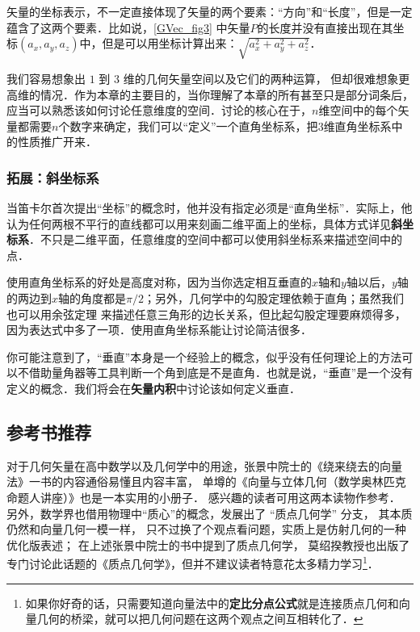 矢量的坐标表示，不一定直接体现了矢量的两个要素：“方向”和“长度”，但是一定蕴含了这两个要素．比如说，\autoref{GVec_fig3} 中矢量$P$的长度并没有直接出现在其坐标$(a_x, a_y, a_z)$中，但是可以用坐标计算出来：$\sqrt{a_x^2+a_y^2+a_z^2}$．

我们容易想象出 $1$ 到 $3$ 维的几何矢量空间以及它们的两种运算， 但却很难想象更高维的情况．作为本章的主要目的，当你理解了本章的所有甚至只是部分词条后，应当可以熟悉该如何讨论任意维度的空间．讨论的核心在于，$n$维空间中的每个矢量都需要$n$个数字来确定，我们可以“定义”一个直角坐标系，把$3$维直角坐标系中的性质推广开来．

\subsubsection{拓展：斜坐标系}

当笛卡尔首次提出“坐标”的概念时，他并没有指定必须是“直角坐标”．实际上，他认为任何两根不平行的直线都可以用来刻画二维平面上的坐标，具体方式详见\textbf{斜坐标系}．不只是二维平面，任意维度的空间中都可以使用斜坐标系来描述空间中的点．

使用直角坐标系的好处是高度对称，因为当你选定相互垂直的$x$轴和$y$轴以后，$y$轴的两边到$x$轴的角度都是$\pi/2$；另外，几何学中的勾股定理依赖于直角；虽然我们也可以用余弦定理%
来描述任意三角形的边长关系，但比起勾股定理要麻烦得多，因为表达式中多了一项．使用直角坐标系能让讨论简洁很多．

你可能注意到了，“垂直”本身是一个经验上的概念，似乎没有任何理论上的方法可以不借助量角器等工具判断一个角到底是不是直角．也就是说，“垂直”是一个没有定义的概念．我们将会在\textbf{矢量内积}中讨论该如何定义垂直．



\subsection{参考书推荐}
对于几何矢量在高中数学以及几何学中的用途，张景中院士的《绕来绕去的向量法》一书的内容通俗易懂且内容丰富， 单墫的《向量与立体几何（数学奥林匹克命题人讲座）》也是一本实用的小册子． 感兴趣的读者可用这两本读物作参考． 另外，数学界也借用物理中“质心”的概念，发展出了 “质点几何学” 分支， 其本质仍然和向量几何一模一样， 只不过换了个观点看问题，实质上是仿射几何的一种优化版表述； 在上述张景中院士的书中提到了质点几何学， 莫绍揆教授也出版了专门讨论此话题的《质点几何学》，但并不建议读者特意花太多精力学习\footnote{如果你好奇的话，只需要知道向量法中的\textbf{定比分点公式}就是连接质点几何和向量几何的桥梁，就可以把几何问题在这两个观点之间互相转化了．}．

